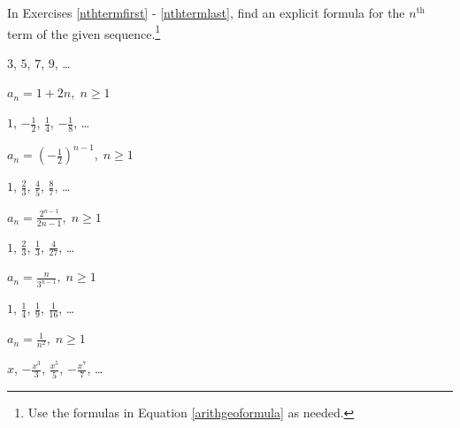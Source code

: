 \documentclass{ximera}
\begin{document}
\begin{question}
    
In Exercises \ref{nthtermfirst} - \ref{nthtermlast}, find an explicit formula for the $n^{\mbox{th}}$ term of the given sequence.\footnote{Use the formulas in Equation \ref{arithgeoformula} as needed.}

\begin{problem}\label{nthtermfirst}
    $3$, $5$, $7$, $9$, \ldots

    \begin{solution}
         $a_{n} = 1 + 2n, \; n \geq 1$
    \end{solution}
\end{problem}

\begin{problem}
    $1$, $-\frac{1}{2}$, $\frac{1}{4}$, $-\frac{1}{8}$, \ldots

    \begin{solution}
        $a_{n} = \left(-\frac{1}{2}\right)^{n - 1}, \; n \geq 1$
    \end{solution}
\end{problem}

\begin{problem}
    $1$, $\frac{2}{3}$, $\frac{4}{5}$, $\frac{8}{7}$, \ldots

    \begin{solution}
        $a_{n} = \frac{2^{n - 1}}{2n - 1}, \; n \geq 1$
    \end{solution}
\end{problem}

\begin{problem}
    $1$, $\frac{2}{3}$, $\frac{1}{3}$, $\frac{4}{27}$, \ldots

    \begin{solution}
        $a_{n} = \frac{n}{3^{n - 1}}, \; n \geq 1$
    \end{solution}
\end{problem}

\begin{problem}
    $1$, $\frac{1}{4}$, $\frac{1}{9}$, $\frac{1}{16} $, \ldots

    \begin{solution}
        $a_{n} = \frac{1}{n^{2}}, \; n \geq 1$
    \end{solution}
\end{problem}

\begin{problem}
    $x$, $-\frac{x^3}{3}$, $\frac{x^5}{5}$, $-\frac{x^7}{7}$, \ldots


\end{problem}
\end{question}
\end{document}
